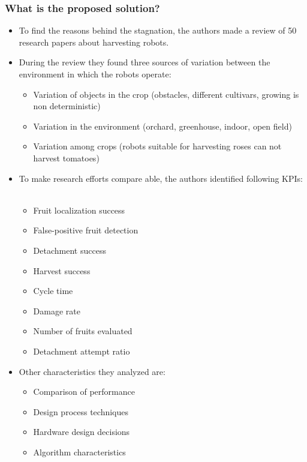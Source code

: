     \subsubsection*{What is the proposed solution?}
    \begin{itemize}
        \item To find the reasons behind the stagnation, the authors made a review of 50 research papers about harvesting robots. 
        \item During the review they found three sources of variation between the environment in which the robots operate: \ \begin{itemize}
            \item Variation of objects in the crop (obstacles, different cultivars, growing is non deterministic)
            \item Variation in the environment (orchard, greenhouse, indoor, open field)
            \item Variation among crops (robots suitable for harvesting roses can not harvest tomatoes)
        \end{itemize}
        \item To make research efforts compare able, the authors identified following KPIs: \ \begin{itemize}
            \item Fruit localization success
            \item False-positive fruit detection
            \item Detachment success
            \item Harvest success
            \item Cycle time
            \item Damage rate
            \item Number of fruits evaluated
            \item Detachment attempt ratio
        \end{itemize}
        \item Other characteristics they analyzed are: \ \begin{itemize}
            \item Comparison of performance
            \item Design process techniques
            \item Hardware design decisions
            \item Algorithm characteristics 
        \end{itemize}
    \end{itemize}

